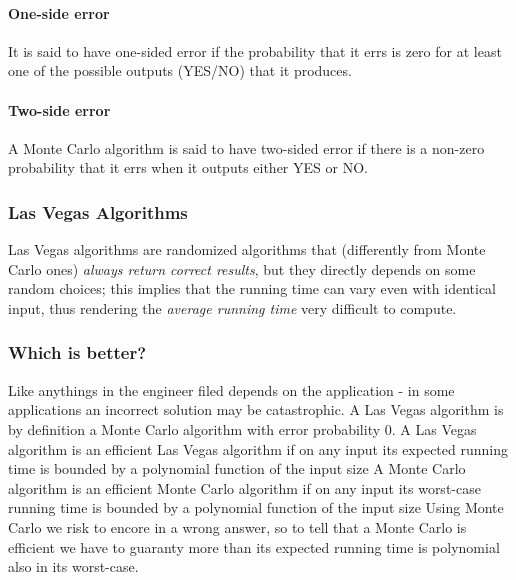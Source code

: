 \documentclass{article}
\begin{document}
				\paragraph{One-side error}
				It is said to have one-sided error if the probability that it errs is zero for at least one of the possible outputs (YES/NO) that it produces.
				\paragraph{Two-side error}
				A Monte Carlo algorithm is said to have two-sided error if there is a non-zero probability that it errs when it outputs either YES or NO.
	
			\subsubsection{Las Vegas Algorithms}
				Las Vegas algorithms are randomized algorithms that (differently from Monte Carlo ones) \textit{always return correct results}, but they directly depends on some random  choices; this implies that the running time can vary even with identical input, thus rendering the \textit{average running time} very difficult to compute.
			
			\subsubsection{Which is better?}
			Like anythings in the engineer filed depends on the application - in some applications an incorrect solution may be catastrophic.
			A Las Vegas algorithm is by definition a Monte Carlo algorithm with error probability 0.
			A Las Vegas algorithm is an efficient Las Vegas algorithm if on any input its expected running time is bounded by a polynomial function of the input size
			A Monte Carlo algorithm is an efficient Monte Carlo algorithm if on any input its worst-case running time is bounded by a polynomial function of the input size
			Using Monte Carlo we risk to encore in a wrong answer, so to tell that a Monte Carlo is efficient we have to guaranty more than its expected running time is polynomial also in its worst-case.
\end{document}
